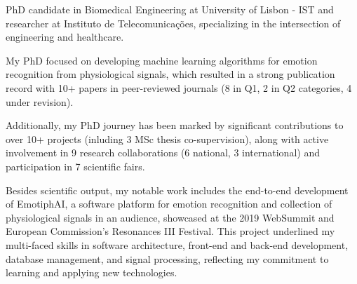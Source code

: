 

\begin{cvparagraph}

PhD candidate in Biomedical Engineering at University of Lisbon - IST and researcher at Instituto de Telecomunicações, specializing in the intersection of engineering and healthcare. 

My PhD focused on developing machine learning algorithms for emotion recognition from physiological signals, which resulted in a strong publication record with 10+ papers in peer-reviewed journals (8 in Q1, 2 in Q2 categories, 4 under revision). 

Additionally, my PhD journey has been marked by significant contributions to over 10+ projects (inluding 3 MSc thesis co-supervision), along with active involvement in 9 research collaborations (6 national, 3 international) and participation in 7 scientific fairs.

Besides scientific output, my notable work includes the end-to-end development of EmotiphAI, a software platform for emotion recognition and collection of physiological signals in an audience, showcased at the 2019 WebSummit and European Commission's Resonances III Festival. This project underlined my multi-faced skills in software architecture, front-end and back-end development, database management, and signal processing, reflecting my commitment to learning and applying new technologies.
\end{cvparagraph}
